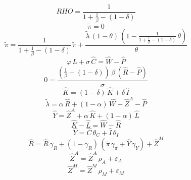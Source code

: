 \begin{dmath*}
RHO = \frac{1}{1+\frac{1}{{{\beta}}}-\left(1-{{\delta}}\right)}
\end{dmath*}
\begin{dmath}
{{\tilde{\pi}}}=0
\end{dmath}
\begin{dmath}
{{\tilde{\pi}}}=\frac{1}{1+\frac{1}{{{\beta}}}-\left(1-{{\delta}}\right)}\, {{\tilde{\pi}}}+\frac{{{\tilde{\lambda}}}\, \left(1-{{\theta}}\right)\, \left(1-\frac{1}{1+\frac{1}{{{\beta}}}-\left(1-{{\delta}}\right)}\, {{\theta}}\right)}{{{\theta}}}
\end{dmath}
\begin{dmath}
{{\varphi}}\, {{\hat{L}}}+{{\sigma}}\, {{\hat{C}}}={{\hat{W}}}-{{\hat{P}}}
\end{dmath}
\begin{dmath}
0=\frac{\left(\frac{1}{{{\beta}}}-\left(1-{{\delta}}\right)\right)\, {{\beta}}\, \left({{\hat{R}}}-{{\hat{P}}}\right)}{{{\sigma}}}
\end{dmath}
\begin{dmath}
{{\hat{K}}}=\left(1-{{\delta}}\right)\, {{\hat{K}}}+{{\delta}}\, {{\hat{I}}}
\end{dmath}
\begin{dmath}
{{\tilde{\lambda}}}={{\alpha}}\, {{\hat{R}}}+\left(1-{{\alpha}}\right)\, {{\hat{W}}}-{{\hat{Z}^A}}-{{\hat{P}}}
\end{dmath}
\begin{dmath}
{{\hat{Y}}}={{\hat{Z}^A}}+{{\alpha}}\, {{\hat{K}}}+\left(1-{{\alpha}}\right)\, {{\hat{L}}}
\end{dmath}
\begin{dmath}
{{\hat{K}}}-{{\hat{L}}}={{\hat{W}}}-{{\hat{R}}}
\end{dmath}
\begin{dmath}
{{\hat{Y}}}={{\hat{C}}}\, {{\theta_C}}+{{\hat{I}}}\, {{\theta_I}}
\end{dmath}
\begin{dmath}
{{\hat{R}}}={{\hat{R}}}\, {{\gamma_R}}+\left(1-{{\gamma_R}}\right)\, \left({{\tilde{\pi}}}\, {{\gamma_\pi}}+{{\hat{Y}}}\, {{\gamma_Y}}\right)+{{\hat{Z}^M}}
\end{dmath}
\begin{dmath}
{{\hat{Z}^A}}={{\hat{Z}^A}}\, {{\rho_A}}+{{\varepsilon_A}}
\end{dmath}
\begin{dmath}
{{\hat{Z}^M}}={{\hat{Z}^M}}\, {{\rho_M}}+{{\varepsilon_M}}
\end{dmath}
